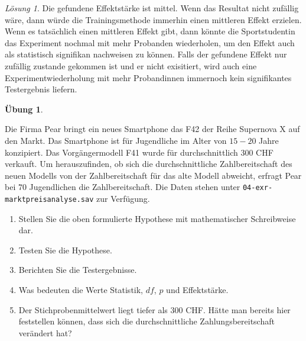\documentclass[
]{book}
\providecommand{\tightlist}{%
  \setlength{\itemsep}{0pt}\setlength{\parskip}{0pt}}
\theoremstyle{definition}
\theoremstyle{definition}
\theoremstyle{definition}
\newtheorem{exercise}{Übung}[chapter]
\theoremstyle{definition}
\theoremstyle{remark}
\newtheorem*{solution}{Lösung}
\begin{document}
\begin{solution}
Die gefundene Effektstärke ist mittel. Wenn das Resultat nicht zufällig wäre, dann würde die Trainingsmethode immerhin einen mittleren Effekt erzielen. Wenn es tatsächlich einen mittleren Effekt gibt, dann könnte die Sportstudentin das Experiment nochmal mit mehr Probanden wiederholen, um den Effekt auch als statistisch signifikan nachweisen zu können. Falls der gefundene Effekt nur zufällig zustande gekommen ist und er nicht exisitiert, wird auch eine Experimentwiederholung mit mehr Probandinnen immernoch kein signifikantes Testergebnis liefern.
\end{solution}

\begin{exercise}
\protect\hypertarget{exr:markpreisanalyse-testen}{}\label{exr:markpreisanalyse-testen}\leavevmode

Die Firma Pear bringt ein neues Smartphone das F42 der Reihe Supernova X auf den Markt. Das Smartphone ist für Jugendliche im Alter von \(15-20\) Jahre konzipiert. Das Vorgängermodell F41 wurde für durchschnittlich \(300\) CHF verkauft. Um herauszufinden, ob sich die durchschnittliche Zahlbereitschaft des neuen Modells von der Zahlbereitschaft für das alte Modell abweicht, erfragt Pear bei \(70\) Jugendlichen die Zahlbereitschaft. Die Daten stehen unter \texttt{04-exr-marktpreisanalyse.sav} zur Verfügung.

\begin{enumerate}
\def\labelenumi{\alph{enumi})}
\tightlist
\item
  Stellen Sie die oben formulierte Hypothese mit mathematischer Schreibweise dar.
\item
  Testen Sie die Hypothese.
\item
  Berichten Sie die Testergebnisse.
\item
  Was bedeuten die Werte Statistik, \(df\), \(p\) und Effektstärke.
\item
  Der Stichprobenmittelwert liegt tiefer als \(300\) CHF. Hätte man bereits hier feststellen können, dass sich die durchschnittliche Zahlungsbereitschaft verändert hat?
\end{enumerate}

\end{exercise}
\end{document}
